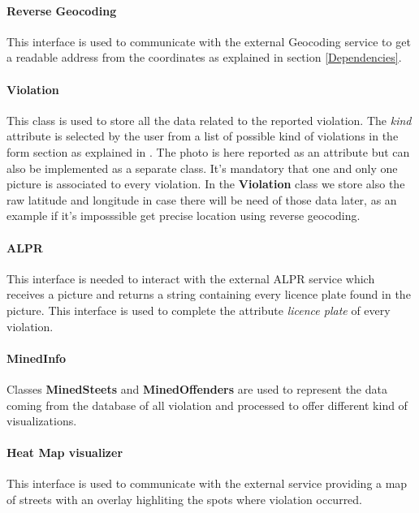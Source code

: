\paragraph{Reverse Geocoding}
This interface is used to communicate with the external Geocoding service to get a readable address from the coordinates as explained in section \ref{Dependencies}.

\paragraph{Violation}
This class is used to store all the data related to the reported violation. The \textit{kind} attribute is selected by the user from a list of possible kind of violations in the form section as explained in . The photo is here reported as an attribute but can also be implemented as a separate class. It's mandatory that one and only one picture is associated to every violation. In the \textbf{Violation} class we store also the raw latitude and longitude in case there will be need of those data later, as an example if it's imposssible get precise location using reverse geocoding.

\paragraph{ALPR}
This interface is needed to interact with the external ALPR service which receives a picture and returns a string containing every licence plate found in the picture. This interface is used to complete the attribute \textit{licence plate} of every violation.

\paragraph{MinedInfo}
Classes \textbf{MinedSteets} and \textbf{MinedOffenders} are used to represent the data coming from the database of all violation and processed to offer different kind of visualizations.

\paragraph{Heat Map visualizer}
This interface is used to communicate with the external service providing a map of streets with an overlay highliting the spots where violation occurred.

